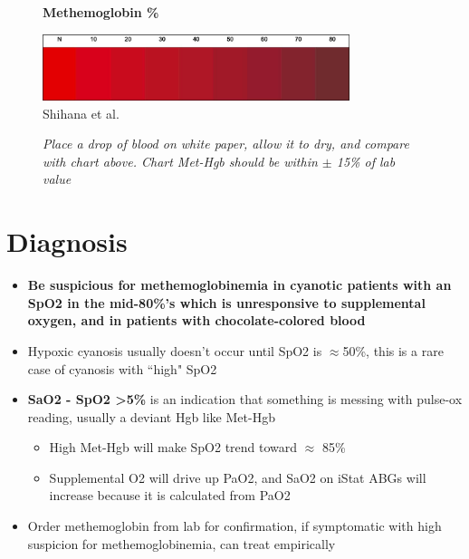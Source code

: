 \documentclass[main.tex]{subfiles}
\begin{document}
\begin{figure}[tb]
	\centering
	\caption{\textbf{Methemoglobin \%}}
	\label{img:methgb-gradient}
	\includegraphics[width=0.8\textwidth]{img/methemoglobinemia/color-chart.png}\\
	\raggedleft \footnotesize Shihana et al. \hspace{0.1\textwidth}
	\caption*{\footnotesize \textit{Place a drop of blood on white paper, allow it to dry, and compare with chart above. Chart Met-Hgb should be within $\pm$ 15\% of lab value}}
\end{figure}

\section{Diagnosis}

\begin{itemize}[noitemsep]
	\item \textbf{Be suspicious for methemoglobinemia in cyanotic patients with an SpO2 in the mid-80\%'s which is unresponsive to supplemental oxygen, and in patients with chocolate-colored blood}
	
	\item Hypoxic cyanosis usually doesn't occur until SpO2 is $\approx$50\%, this is a rare case of cyanosis with ``high" SpO2
	
	\item \textbf{SaO2 - SpO2 \textgreater 5\%} is an indication that something is messing with pulse-ox reading, usually a deviant Hgb like Met-Hgb
	\begin{itemize}[noitemsep]
		\item High Met-Hgb will make SpO2 trend toward $\approx$ 85\%
		\item Supplemental O2 will drive up PaO2, and SaO2 on iStat ABGs will increase because it is calculated from PaO2
	\end{itemize}
	
	\item Order methemoglobin from lab for confirmation, if symptomatic with high suspicion for methemoglobinemia, can treat empirically
\end{itemize}
\end{document}
